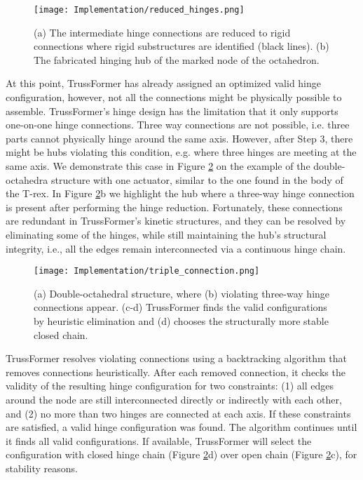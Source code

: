 \begin{figure}[h!]
    \texttt{[image: Implementation/reduced\_hinges.png]}
    \centering
    \caption{(a) The intermediate hinge connections are reduced to rigid connections where rigid substructures are identified (black lines). (b) The fabricated hinging hub of the marked node of the octahedron.}
    \label{fig:reduced_hinges}
\end{figure}
At this point, TrussFormer has already assigned an optimized valid hinge configuration, however, not all the connections might be physically possible to assemble. TrussFormer’s hinge design
has the limitation that it only supports one-on-one hinge connections. Three way connections are not possible, i.e. three parts cannot physically hinge
around the same axis.
However, after Step 3, there might be hubs violating this condition, e.g. where three hinges are meeting at the same axis. We demonstrate this case in Figure \ref{fig:triple_connection} on the example of the double-octahedra structure with one actuator, similar to the one found in the body of the T-rex. In Figure \ref{fig:triple_connection}b we highlight the hub where a three-way hinge connection is present after performing the hinge reduction. Fortunately, these connections are redundant in TrussFormer’s kinetic structures, and they can be resolved by eliminating some of the hinges, while still maintaining the hub’s structural integrity, i.e., all the edges remain interconnected via a continuous hinge chain.
\begin{figure}[h!]
    \texttt{[image: Implementation/triple\_connection.png]}
    \centering
    \caption{(a) Double-octahedral structure, where (b) violating three-way hinge connections appear. (c-d) TrussFormer finds the valid configurations by heuristic elimination and (d) chooses the structurally more stable closed chain.}
    \label{fig:triple_connection}
\end{figure}
TrussFormer resolves violating connections using a backtracking algorithm that removes connections heuristically. After each removed connection, it checks the validity of the resulting hinge configuration for two constraints: (1) all edges around the node are still interconnected directly or indirectly with each other, and (2) no more than two hinges are connected at each axis. If these constraints are satisfied, a valid hinge configuration was found. The algorithm continues until it finds all valid configurations. If available, TrussFormer will select the configuration with closed hinge chain (Figure \ref{fig:triple_connection}d) over open chain (Figure \ref{fig:triple_connection}c), for stability reasons.

